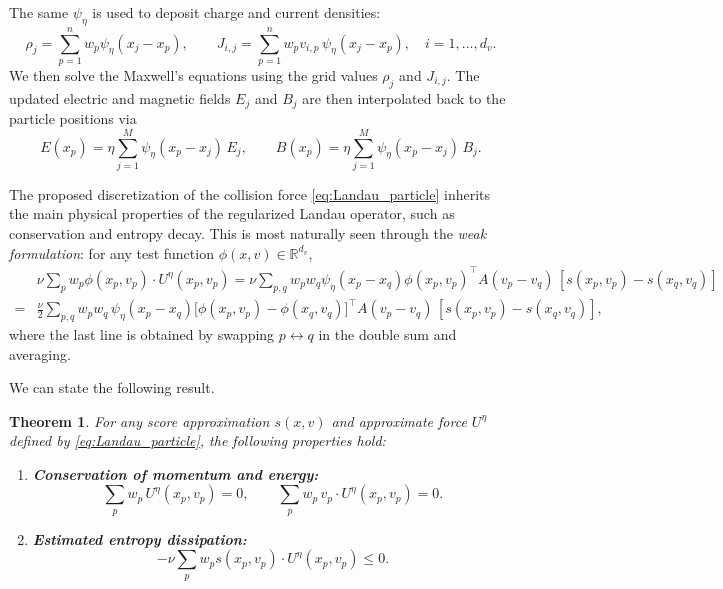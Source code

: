 \documentclass[]{article}
\newcommand{\R}{\mathbb{R}}
\numberwithin{equation}{section}
\newtheorem{theorem}{Theorem}[section]
\begin{document}
The same $\psi_{\eta}$ is used to deposit charge and current densities:
\begin{equation}
\label{eq:deposit}
\rho_j = \sum_{p=1}^{n} w_p\psi_\eta(x_j - x_p), \qquad J_{i,j} =  \sum_{p=1}^{n}w_p v_{i,p}\, \psi_\eta(x_j - x_p), \quad i = 1, \ldots, d_v.
\end{equation}
We then solve the Maxwell's equations using the grid values $\rho_j$ and $J_{i,j}$. The updated electric and magnetic fields $E_j$ and $B_j$ are then interpolated back to the particle positions via
\begin{equation}
\label{eq:interpolate}
E(x_p) = \eta \sum_{j=1}^{M} \psi_\eta(x_p - x_j)\, E_j, \qquad B(x_p) = \eta \sum_{j=1}^{M} \psi_\eta(x_p - x_j)\, B_j.
\end{equation}



The proposed discretization of the collision force \eqref{eq:Landau_particle} inherits the main physical properties of the regularized Landau operator, such as conservation and entropy decay. This is most naturally seen through the \emph{weak formulation}: for any test function $\phi(x,v)\in \R^{d_v}$,
\begin{align}
&\nu\sum_p w_p  \phi (x_p,v_p)\cdot U^{\eta}(x_p,v_p)=\nu\sum_{p,q} w_p w_q \psi_\eta(x_p - x_q)  \phi(x_p,v_p)^\top A(v_p-v_q)\,[s(x_p,v_p) - s(x_q,v_q)]\\
=&\frac{\nu}{2}\sum_{p,q} w_p w_q \, \psi_\eta(x_p - x_q) \big[\phi(x_p,v_p) - \phi(x_q,v_q)\big]^\top A(v_p-v_q)\,[s(x_p,v_p) - s(x_q,v_q)],\label{eq:D_symmetrized}
\end{align}
where the last line is obtained by swapping $p \leftrightarrow q$ in the double sum and averaging.

We can state the following result.
\begin{theorem}
\label{thm:collision}
For any score approximation $s(x,v)$ and approximate force $U^\eta$ defined by \eqref{eq:Landau_particle}, the following properties hold:
\begin{enumerate}
\item[(i)] \textbf{Conservation of momentum and energy:}
\begin{equation}
\sum_p w_p \, U^{\eta}(x_p,v_p) = 0, \qquad \sum_p w_p \, v_p \cdot U^{\eta}(x_p,v_p) = 0.
\end{equation}
\item[(ii)] \textbf{Estimated entropy dissipation:} 
\begin{equation}
-\nu\sum_p w_p s (x_p,v_p)\cdot U^{\eta}(x_p,v_p)\leq 0.
\end{equation}
\end{enumerate}
\end{theorem}
\end{document}
